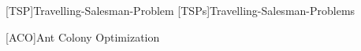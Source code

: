 

\begin{acronym}[EuGH]

    [TSP]{Travelling-Salesman-Problem} 
    [TSPs]{Travelling-Salesman-Problems} 

    [ACO]{Ant Colony Optimization} 
    
\end{acronym}